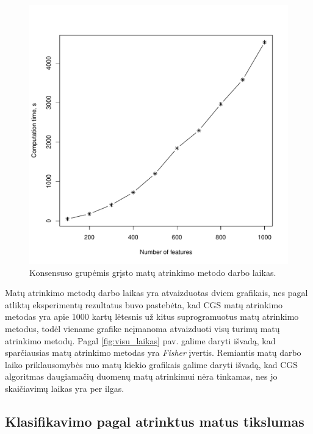 \begin{figure}[hq]
\begin{minipage}[b]{0.5\linewidth}
\includegraphics[width=1\textwidth]{images/cgs_performance.pdf}
 \caption{Konsensuso grupėmis grįsto matų atrinkimo metodo darbo laikas.}
 \label{fig:cgs_laikas}
\end{minipage}
\end{figure}

Matų atrinkimo metodų darbo laikas yra atvaizduotas dviem grafikais, nes pagal atliktų eksperimentų rezultatus buvo pastebėta, kad CGS matų atrinkimo metodas yra apie 1000 kartų lėtesnis už kitus suprogramuotus matų atrinkimo metodus, todėl viename grafike neįmanoma atvaizduoti visų turimų matų atrinkimo metodų. Pagal \ref{fig:visu_laikas} pav. galime daryti išvadą, kad sparčiausias matų atrinkimo metodas yra \textit{Fisher} įvertis. Remiantis matų darbo laiko priklausomybės nuo matų kiekio grafikais galime daryti išvadą, kad CGS algoritmas daugiamačių duomenų matų atrinkimui nėra tinkamas, nes jo skaičiavimų laikas yra per ilgas.

\subsection{Klasifikavimo pagal atrinktus matus tikslumas}

